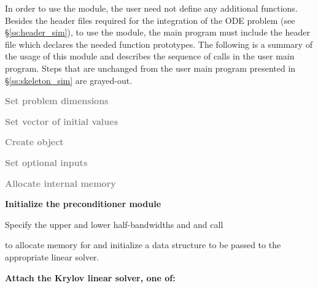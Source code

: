 In order to use the {\cvbandpre} module, the user need not define any
additional functions. 
Besides the header files required for the integration of the ODE problem
(see \S\ref{ss:header_sim}),  to use the {\cvbandpre} module, the main program 
must include the header file  which declares the needed
function prototypes.
The following is a summary of the usage of this module and describes the sequence
of calls in the user main program. Steps that are unchanged from the user main
program presented in \S\ref{ss:skeleton_sim} are grayed-out.
\begin{Steps}
  
\item
  \textcolor{gray}{\bf Set problem dimensions}

\item
  \textcolor{gray}{\bf Set vector of initial values}
 
\item
  \textcolor{gray}{\bf Create {\cvode} object}

\item
  \textcolor{gray}{\bf Set optional inputs}

\item
  \textcolor{gray}{\bf Allocate internal memory}

\item \label{i:bandpre_init}
  {\bf Initialize the {\cvbandpre} preconditioner module}

  Specify the upper and lower half-bandwidths  and  and call 


  to allocate memory for and initialize a data structure  to be 
  passed to the appropriate {\cvsp} linear solver.

\item \label{i:bandpre_attach}
  {\bf Attach the Krylov linear solver, one of:}





\end{Steps}
